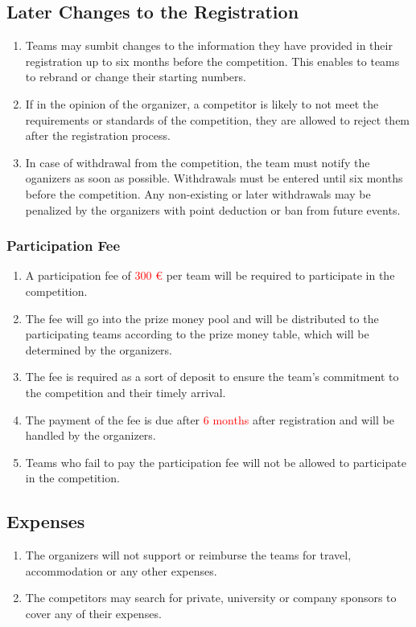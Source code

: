     \subsection{Later Changes to the Registration}
    \begin{enumerate}
      \item Teams may sumbit changes to the information they have provided in their registration up to six months before the competition. This enables to teams to rebrand or change their starting numbers.
      \item If in the opinion of the organizer, a competitor is likely to not meet the requirements or standards
      of the competition, they are allowed to reject them after the registration process. 
      \item In case of withdrawal from the competition, the team must notify the oganizers as soon as possible. Withdrawals must be entered until six months before the competition. 
      Any non-existing or later withdrawals may be penalized by the organizers with point deduction or ban from future events. 
    \end{enumerate}

    \subsubsection{Participation Fee}

    \begin{enumerate}
    \item A participation fee of \textcolor{red}{300 \euro{}} per team will be required to participate in the competition.
    \item The fee will go into the prize money pool and will be distributed to the participating teams according to the prize money table, which will be determined by the organizers.
    \item The fee is required as a sort of deposit to ensure the team's commitment to the competition and their timely arrival.
    \item The payment of the fee is due after \textcolor{red}{6 months} after registration and will be handled by the organizers.
    \item Teams who fail to pay the participation fee will not be allowed to participate in the competition.
    \end{enumerate}

    \subsection{Expenses}
    \begin{enumerate}
      \item The organizers will not support or reimburse the teams for travel, accommodation or any other expenses. 
      \item The competitors may search for private, university or company sponsors to cover any of their expenses.
    \end{enumerate}


